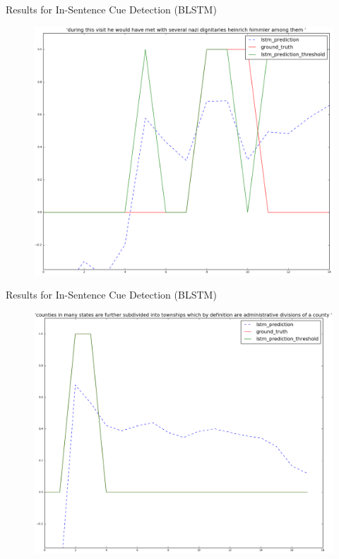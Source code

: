 \documentclass{beamer}
\begin{document}
\begin{frame}{Results for In-Sentence Cue Detection (BLSTM)}
	\begin{figure}[htbp]
		\includegraphics[scale=0.3]{images/task2_2dir/61_type1}
	\end{figure}
\end{frame}
\begin{frame}{Results for In-Sentence Cue Detection (BLSTM)}
	\begin{figure}[htbp]
		\includegraphics[scale=0.3]{images/task2_2dir/67_type1}
	\end{figure}
\end{frame}
\end{document}
